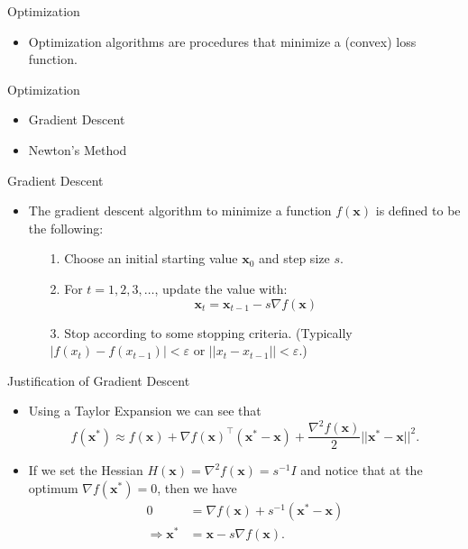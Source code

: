 \documentclass{beamer} %
\renewcommand{\bf}[1]{\mathbf{#1}}
\begin{document}
\begin{frame}{Optimization}
  \begin{itemize}
    \item Optimization algorithms are procedures that minimize a (convex) loss
      function.
  \end{itemize}
\end{frame}

\begin{frame}{Optimization}
  \begin{itemize}
    \item Gradient Descent
    \item Newton's Method
  \end{itemize}
\end{frame}

\begin{frame}{Gradient Descent}
  \begin{itemize}
    \item The gradient descent algorithm to minimize a function $f(\bf{x})$ is defined to be the following:
      \begin{itemize}
        \item[1.] Choose an initial starting value $\bf x_0$ and step size $s$.
        \item[2.] For $t = 1, 2, 3, \dots$, update the value with:
          $$
          \bf{x}_{t} = \bf{x}_{t-1} - s \nabla f(\bf{x})
          $$
        \item[3.] Stop according to some stopping criteria. (Typically $|f(x_t)
          - f(x_{t-1})| < \varepsilon$ or $||x_t - x_{t-1}|| < \varepsilon$.)
      \end{itemize}
  \end{itemize}
\end{frame}

\begin{frame}{Justification of Gradient Descent}
  \begin{itemize}
    \item Using a Taylor Expansion we can see that
      $$
      f(\bf x^*) \approx f(\bf x) + \nabla f(\bf x)^\top (\bf x^* - \bf x) + \frac{\nabla^2 f(\bf x)}{2} ||\bf x^* - \bf x||^2.
      $$
    \item If we set the Hessian $H(\bf x) = \nabla^2 f(\bf x) = s^{-1} I$ and notice that at the optimum $\nabla f(\bf x^*) = 0$, then we have
      $$
      \begin{aligned}
        0 &= \nabla f(\bf x) + s^{-1} (\bf x^* - \bf x) \\
        \Rightarrow \bf x^* &= \bf x - s \nabla f(\bf x).
      \end{aligned}
      $$
  \end{itemize}
\end{frame}
\end{document}

